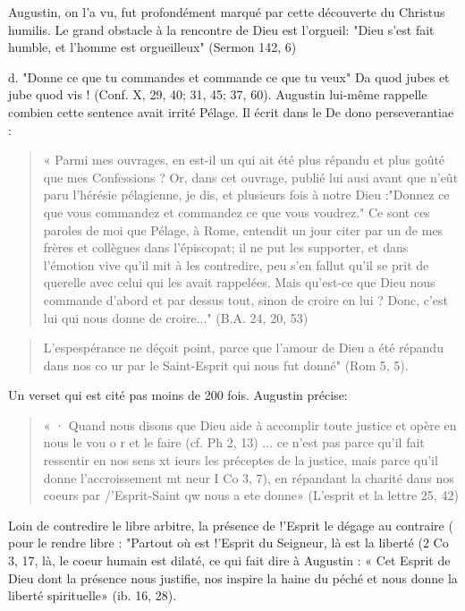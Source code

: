 Augustin, on l'a vu, fut profondément marqué par cette découverte du Christus humilis. Le grand obstacle à la rencontre de Dieu est l'orgueil: "Dieu s'est fait humble, et l'homme est orgueilleux" (Sermon 142, 6)

d.	"Donne ce que tu commandes et commande ce que tu veux" Da quod jubes et jube quod vis ! (Conf. X, 29, 40; 31, 45; 37, 60). Augustin lui-même rappelle combien cette sentence avait irrité Pélage. Il écrit dans le De dono perseverantiae :
\begin{quote}
    « Parmi mes ouvrages, en est-il un qui ait été plus répandu et plus goûté que mes Confessions ? Or, dans cet ouvrage, publié lui ausi avant que n'eût paru l'hérésie pélagienne, je dis, et plusieurs fois à notre Dieu :"Donnez ce que vous commandez et commandez ce que vous voudrez." Ce sont ces paroles de moi que Pélage, à Rome, entendit un jour citer par un de mes frères et collègues dans l'épiscopat; il ne put les supporter, et dans l'émotion vive qu'il mit à les contredire, peu s'en fallut qu'il se prit de querelle avec celui qui les avait rappelées. Mais qu'est-ce que Dieu nous commande d'abord et par dessus tout, sinon de croire en lui ? Donc, c'est lui qui nous donne de croire..." (B.A. 24, 20, 53)
\end{quote}


\begin{quote}
    L'espespérance ne déçoit point, parce que l'amour de Dieu a été répandu dans nos co ur par le Saint-Esprit qui nous fut donné" (Rom 5, 5). 
\end{quote}
Un verset qui est cité pas moins de 200 fois. Augustin précise:
\begin{quote}
    « · Quand nous disons que Dieu aide à accomplir toute justice et opère en nous le vou o r et le faire (cf. Ph 2, 13) ... ce n'est pas parce qu'il fait ressentir en nos sens xt ieurs les préceptes  de la justice, mais parce qu'il donne l'accroissement mt neur   I Co 3, 7), en répandant la charité dans nos coeurs par /'Esprit-Saint
qw nous a ete donne» (L'esprit et la lettre 25, 42)

\end{quote}

 
 
Loin de contredire le libre arbitre, la présence de !'Esprit le dégage au contraire	( pour le rendre libre : "Partout où est !'Esprit du Seigneur, là est la liberté (2 Co 3,
17, là, le coeur humain est dilaté, ce qui fait dire à Augustin : « Cet Esprit de Dieu dont
la présence nous justifie, nos inspire la haine du péché et nous donne la liberté spirituelle» (ib. 16, 28).

